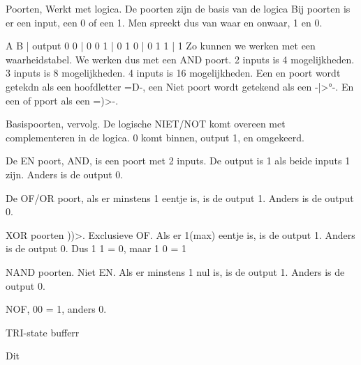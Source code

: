 Poorten, Werkt met logica. De poorten zijn de basis van de logica
Bij poorten is er een input, een 0 of een 1. Men spreekt dus van waar en onwaar, 1 en 0.

A B | output
0 0 | 0
0 1 | 0
1 0 | 0
1 1 | 1
Zo kunnen we werken met een waarheidstabel. We werken dus met een AND poort. 
2 inputs is 4 mogelijkheden. 3 inputs is 8 mogelijkheden. 4 inputs is 16 mogelijkheden.
Een en poort wordt getekdn als een hoofdletter =D-, een Niet poort wordt getekend als een -|>°-. En een of pport als een =)>-.

Basispoorten, vervolg.
De logische NIET/NOT komt overeen met complementeren in de logica. 0 komt binnen, output 1, en omgekeerd. 

De EN poort, AND, is een poort met 2 inputs. De output is 1 als beide inputs 1 zijn. Anders is de output 0.

De OF/OR poort, als er minstens 1 eentje is, is de output 1. Anders is de output 0.

XOR poorten ))>. Exclusieve OF. Als er 1(max) eentje is, is de output 1. Anders is de output 0. Dus 1 1 = 0, maar 1 0 = 1

NAND poorten. Niet EN. Als er minstens 1 nul is, is de output 1. Anders is de output 0.

NOF, 00 = 1, anders 0.

TRI-state bufferr

Dit 
